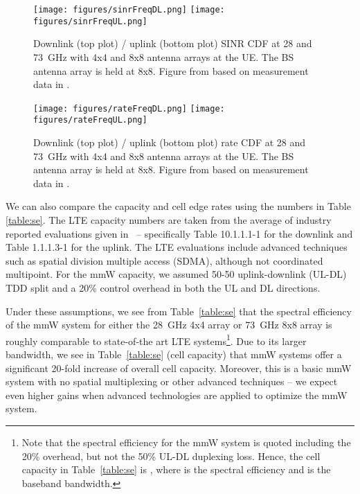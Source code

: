 \documentclass[journal]{IEEEtran}
\begin{document}
\begin{figure}
    \centering
    \texttt{[image: figures/sinrFreqDL.png]}
    \texttt{[image: figures/sinrFreqUL.png]}
    \caption{Downlink (top plot) / uplink (bottom plot) SINR CDF
        at 28 and 73~GHz with 4x4 and 8x8 antenna arrays at the UE.
        The BS antenna array is held at 8x8.
        Figure from \cite{AkLiuRanRapEr:13-arxiv} based on measurement data in
        \cite{rappaportmillimeter}.}
    \label{fig:sinrGeoTxPow}
\end{figure}
\begin{figure}
    \centering
    \texttt{[image: figures/rateFreqDL.png]}
    \texttt{[image: figures/rateFreqUL.png]}
    \caption{Downlink (top plot) / uplink (bottom plot) rate CDF
    at 28 and 73~GHz with 4x4 and 8x8 antenna arrays at the UE.
    The BS antenna array is held at 8x8.
    Figure from \cite{AkLiuRanRapEr:13-arxiv} based on measurement data in
        \cite{rappaportmillimeter}.}
    \label{fig:rateGeoTxPow}
\end{figure}

We can also compare the capacity and cell edge rates using the numbers in
Table \ref{table:se}.
The LTE capacity numbers are taken from the average of industry
reported evaluations given in~\cite{3GPP36.814}
-- specifically Table 10.1.1.1-1 for the downlink
and Table 1.1.1.3-1 for the uplink.  The LTE evaluations include
advanced techniques such as spatial division multiple access (SDMA),
although not coordinated multipoint.
For the mmW capacity, we assumed 50-50 uplink-downlink (UL-DL) TDD split and a 20\%
control overhead in both the UL and DL directions.

Under these assumptions, we see from Table~\ref{table:se}
that the spectral efficiency of the mmW system
for either the 28~GHz 4x4 array or 73~GHz 8x8 array is roughly comparable
to state-of-the art LTE
systems\footnote{Note that the spectral efficiency for the mmW
system is quoted including the 20\% overhead, but not the 50\% UL-DL duplexing loss.
Hence, the cell capacity in Table~\ref{table:se} is , where
 is the spectral efficiency and  is the baseband bandwidth.}.
Due to its larger bandwidth, we see in Table~\ref{table:se} (cell capacity)
that  mmW systems offer
a significant 20-fold
increase of overall cell capacity.
Moreover, this is a basic mmW system with no spatial multiplexing or other advanced
techniques --  we expect even higher gains when advanced technologies are applied to optimize the mmW system.
\end{document}
